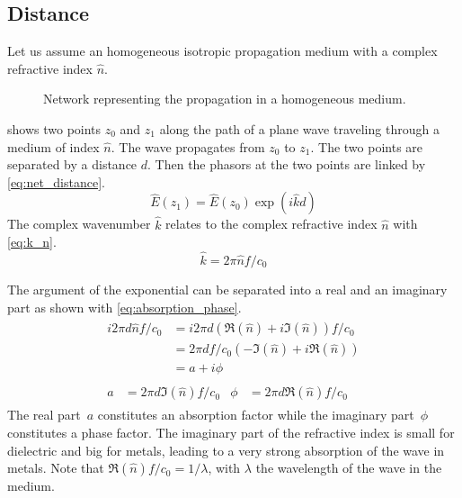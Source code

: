 \subsection{Distance}
\label{sec:generic_networks_distance}
Let us assume an homogeneous isotropic propagation medium with a complex refractive index $\hat{n}$.

\begin{figure}[hbtp]
    \centering
    
    \caption{Network representing the propagation in a homogeneous medium.}
    \label{fig:net_distance}
\end{figure}
 shows two points $z_0$ and $z_1$ along the path of a plane wave traveling through a medium of index $\hat{n}$.
The wave propagates from $z_0$ to $z_1$.
The two points are separated by a distance $d$.
Then the phasors at the two points are linked by \cref{eq:net_distance}.
\begin{equation}
    \hat{E}(z_1) = \hat{E}(z_0) \exp(i\hat{k}d)
    \label{eq:net_distance}
\end{equation}
The complex wavenumber $\hat{k}$ relates to the complex refractive index $\hat{n}$ with \cref{eq:k_n}.
\begin{equation}
    \hat{k} = 2\pi \hat{n} f / c_0 \label{eq:k_n}
\end{equation}

The argument of the exponential can be separated into a real and an imaginary part as shown with \cref{eq:absorption_phase}.
\begin{gather}
    \begin{aligned}
        i 2\pi d \hat{n} f / c_0
        &= i 2\pi d \left(\Re(\hat{n}) + i\Im(\hat{n})\right) f / c_0 \\
        &= 2\pi d f / c_0 \left(-\Im(\hat{n}) + i\Re(\hat{n}) \right) \\
        &= a + i \phi
    \end{aligned}
    \label{eq:absorption_phase}
    \\
    \begin{aligned}
        a &= 2\pi d \Im(\hat{n}) f / c_0   &   \phi &= 2\pi d \Re(\hat{n}) f / c_0
    \end{aligned}
\end{gather}
The real part~$a$ constitutes an absorption factor while the imaginary part~$\phi$ constitutes a phase factor.
The imaginary part of the refractive index is small for dielectric and big for metals,
leading to a very strong absorption of the wave in metals.
Note that $\Re(\hat{n}) f / c_0 = 1 / \lambda$, with $\lambda$ the wavelength of the wave in the medium.

